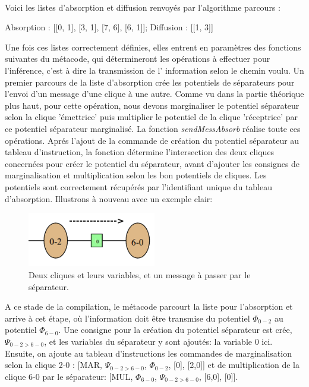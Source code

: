 \documentclass[a4paper]{article}
\begin{document}
\\Voici les listes d'absorption et diffusion renvoyés par l'algorithme parcours : 
\begin{snugshade} Absorption : [[0, 1], [3, 1], [7, 6], [6, 1]]; Diffusion : [[1, 3]]  \end{snugshade}
Une fois ces listes correctement définies, elles entrent en paramètres des fonctions suivantes du métacode, qui détermineront les opérations à effectuer pour l'inférence, c'est à dire la transmission de l'
information selon le chemin voulu. Un premier parcours de la liste d'absorption crée les potentiels de séparateurs pour l'envoi d'un message d'une clique à une autre. Comme vu dans la partie
théorique plus haut, pour cette opération, nous devons marginaliser le potentiel séparateur selon la clique 'émettrice' puis multiplier le potentiel de la clique 'réceptrice' par ce potentiel séparateur
marginalisé. La fonction \textit{sendMessAbsorb} réalise toute ces opérations. Aprés l'ajout de la commande de création du potentiel séparateur au tableau d'instruction, la fonction détermine l'intersection 
des deux cliques concernées pour créer le potentiel du séparateur, avant d'ajouter les consignes de marginalisation et multiplication selon les bon potentiels de cliques. Les potentiels sont correctement 
récupérés par l'identifiant unique du tableau d'absorption. Illustrons à nouveau avec un exemple clair: \\
\begin{figure}[h!]
 \centering
 \includegraphics[width=0.5\textwidth]{Images/SendMessAbsorp.png}
 \caption{Deux cliques et leurs variables, et un message à passer par le séparateur.}
 \label{fig:sendMessAbsorb}
\end{figure}
A ce stade de la compilation, le métacode parcourt la liste pour l'absorption et arrive à cet étape, où l'information doit être transmise du potentiel $\Phi_{0-2}$ au potentiel $\Phi_{6-0}$. Une consigne
pour la création du potentiel séparateur est crée, $\Psi_{0-2>6-0}$, et les variables du séparateur y sont ajoutés: la variable 0 ici. Ensuite, on ajoute au tableau d'instructions les commandes de marginalisation selon
la clique 2-0 : [MAR, $\Psi_{0-2>6-0}$, $\Phi_{0-2}$, [0], [2,0]] et de multiplication de la clique 6-0 par le séparateur: [MUL, $\Phi_{6-0}$, $\Psi_{0-2>6-0}$, [6,0], [0]]. \\
\end{document}
